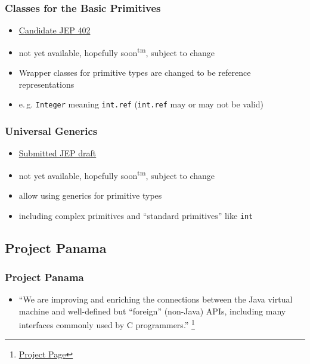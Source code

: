 \documentclass{beamer}
\begin{document}
\begin{frame}
\frametitle{Classes for the Basic Primitives}
\begin{itemize}
  \item \href{https://openjdk.org/jeps/402}{Candidate JEP 402}
  \item not yet available, hopefully soon\textsuperscript{tm}, subject to change
  \pause
  \item Wrapper classes for primitive types are changed to be reference representations
  \item e.\,g. \texttt{Integer} meaning \texttt{int.ref} (\texttt{int.ref} may or may not be valid)
\end{itemize}
\end{frame}

\begin{frame}
\frametitle{Universal Generics}
\begin{itemize}
  \item \href{https://openjdk.org/jeps/8261529}{Submitted JEP draft}
  \item not yet available, hopefully soon\textsuperscript{tm}, subject to change
  \pause
  \item allow using generics for primitive types
  \item including complex primitives and ``standard primitives'' like \texttt{int}
\end{itemize}
\end{frame}

\subsection{Project Panama}
\begin{frame}
\frametitle{Project Panama}
\begin{itemize}
  \item ``We are improving and enriching the connections between the Java virtual machine and well-defined but ``foreign'' (non-Java) APIs, including many interfaces commonly used by C programmers.''
  \footnote{\href{https://openjdk.org/projects/panama/}{Project Page}}
\end{itemize}
\end{frame}
\end{document}
